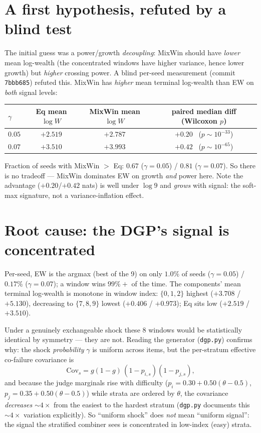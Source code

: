 \documentclass[11pt]{article}
\begin{document}
\section{A first hypothesis, refuted by a blind test}

The initial guess was a power/growth \emph{decoupling}: MixWin should have
\emph{lower} mean log-wealth (the concentrated windows have higher variance,
hence lower growth) but \emph{higher} crossing power. A blind per-seed
measurement (commit \texttt{7bbb685}) refuted this. MixWin has \emph{higher}
mean terminal log-wealth than EW on \emph{both} signal levels:

\begin{table}[h]
\centering
\begin{tabular}{lccc}
\toprule
$\gamma$ & Eq mean $\log W$ & MixWin mean $\log W$ & paired median diff (Wilcoxon $p$) \\
\midrule
$0.05$ & $+2.519$ & $+2.787$ & $+0.20$ \ ($p\sim 10^{-33}$) \\
$0.07$ & $+3.510$ & $+3.993$ & $+0.42$ \ ($p\sim 10^{-65}$) \\
\bottomrule
\end{tabular}
\end{table}

\noindent Fraction of seeds with MixWin $>$ Eq: $0.67$ ($\gamma=0.05$) /
$0.81$ ($\gamma=0.07$). So there is no tradeoff --- MixWin dominates EW on
growth \emph{and} power here. Note the advantage ($+0.20$/$+0.42$ nats) is well
under $\log 9$ and \emph{grows} with signal: the soft-max signature, not a
variance-inflation effect.

\section{Root cause: the DGP's signal is concentrated}

Per-seed, EW is the argmax (best of the 9) on only $1.0\%$ of seeds
($\gamma=0.05$) / $0.17\%$ ($\gamma=0.07$); a window wins $99\%+$ of the time.
The components' mean terminal log-wealth is monotone in window index:
$\{0,1,2\}$ highest ($+3.708$ / $+5.130$), decreasing to $\{7,8,9\}$ lowest
($+0.406$ / $+0.973$); Eq sits low ($+2.519$ / $+3.510$).

Under a genuinely exchangeable shock these 8 windows would be statistically
identical by symmetry --- they are not. Reading the generator (\texttt{dgp.py})
confirms why: the shock \emph{probability} $\gamma$ is uniform across items, but
the per-stratum effective co-failure covariance is
\[
  \mathrm{Cov}_{s} = g(1-g)\,(1-p_{i,s})(1-p_{j,s}),
\]
and because the judge marginals rise with difficulty
($p_i = 0.30 + 0.50(\theta-0.5)$, $p_j = 0.35 + 0.50(\theta-0.5)$) while strata
are ordered by $\theta$, the covariance \emph{decreases} $\sim 4\times$ from the
easiest to the hardest stratum (\texttt{dgp.py} documents this $\sim 4\times$
variation explicitly). So ``uniform shock'' does \emph{not} mean ``uniform
signal'': the signal the stratified combiner sees is concentrated in low-index
(easy) strata.
\end{document}
